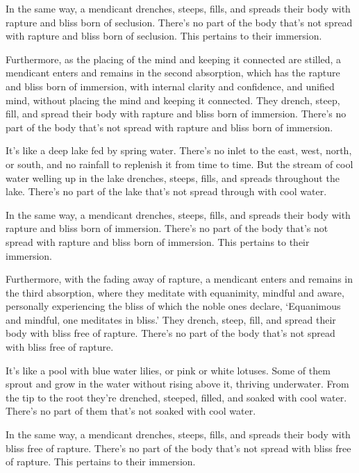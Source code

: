 \documentclass[12pt,openany]{book}%
\begin{document}
In the same way, a mendicant drenches, steeps, fills, and spreads their body with rapture and bliss born of seclusion. There’s no part of the body that’s not spread with rapture and bliss born of seclusion. This pertains to their immersion. 

Furthermore, as the placing of the mind and keeping it connected are stilled, a mendicant enters and remains in the second absorption, which has the rapture and bliss born of immersion, with internal clarity and confidence, and unified mind, without placing the mind and keeping it connected. They drench, steep, fill, and spread their body with rapture and bliss born of immersion. There’s no part of the body that’s not spread with rapture and bliss born of immersion. 

It’s like a deep lake fed by spring water. There’s no inlet to the east, west, north, or south, and no rainfall to replenish it from time to time. But the stream of cool water welling up in the lake drenches, steeps, fills, and spreads throughout the lake. There’s no part of the lake that’s not spread through with cool water. 

In the same way, a mendicant drenches, steeps, fills, and spreads their body with rapture and bliss born of immersion. There’s no part of the body that’s not spread with rapture and bliss born of immersion. This pertains to their immersion. 

Furthermore, with the fading away of rapture, a mendicant enters and remains in the third absorption, where they meditate with equanimity, mindful and aware, personally experiencing the bliss of which the noble ones declare, ‘Equanimous and mindful, one meditates in bliss.’ They drench, steep, fill, and spread their body with bliss free of rapture. There’s no part of the body that’s not spread with bliss free of rapture. 

It’s like a pool with blue water lilies, or pink or white lotuses. Some of them sprout and grow in the water without rising above it, thriving underwater. From the tip to the root they’re drenched, steeped, filled, and soaked with cool water. There’s no part of them that’s not soaked with cool water. 

In the same way, a mendicant drenches, steeps, fills, and spreads their body with bliss free of rapture. There’s no part of the body that’s not spread with bliss free of rapture. This pertains to their immersion. 
\end{document}
